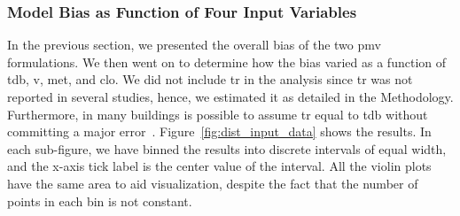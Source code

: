 \subsubsection{Model Bias as Function of Four Input Variables}\label{subsec:model-bias-variable}
In the previous section, we presented the overall bias of the two \ac{pmv} formulations.
We then went on to determine how the bias varied as a function of \ac{tdb}, \ac{v}, \ac{met}, and \ac{clo}.
We did not include \ac{tr} in the analysis since \ac{tr} was not reported in several studies, hence, we estimated it as detailed in the Methodology.
Furthermore, in many buildings is possible to assume \ac{tr} equal to \ac{tdb} without committing a major error~\cite{Dawe2020}.
Figure~\ref{fig:dist_input_data} shows the results.
In each sub-figure, we have binned the results into discrete intervals of equal width, and the x-axis tick label is the center value of the interval.
All the violin plots have the same area to aid visualization, despite the fact that the number of points in each bin is not constant.

